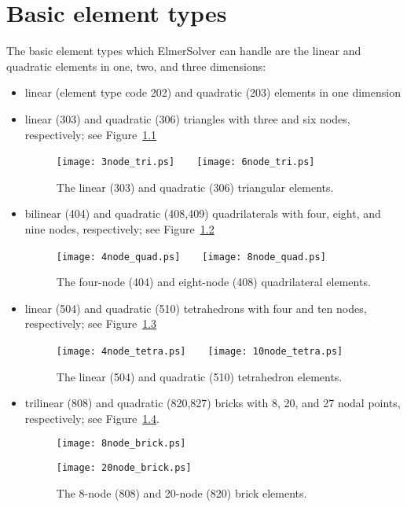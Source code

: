 
\chapter{Basic element types}%
\label{elements}

The basic element types which ElmerSolver can handle are
the linear and quadratic elements in one, two, and three dimensions:
\begin{itemize}
\item linear (element type code 202) and quadratic (203) elements in one dimension
\item linear (303) and quadratic (306) triangles with three and six nodes, respectively; 
see Figure~\ref{triangles}
\begin{figure}[h]
\centerline{ \texttt{[image: 3node\_tri.ps]}\ \ \ \ \texttt{[image: 6node\_tri.ps]} }
\caption{The linear (303) and quadratic (306) triangular elements.}
\label{triangles}
\end{figure}
\item bilinear (404) and quadratic (408,409) quadrilaterals with four, eight, and nine nodes, respectively;  
see Figure~\ref{quads}
\begin{figure}[h]
\centerline{ \texttt{[image: 4node\_quad.ps]}\ \ \ \ \texttt{[image: 8node\_quad.ps]} }
\caption{The four-node (404) and  eight-node (408) quadrilateral elements.}
\label{quads}
\end{figure}
\item linear (504) and quadratic (510) tetrahedrons with four and ten nodes, respectively; 
see Figure~\ref{tetras}
\begin{figure}[h]
\centerline{ \texttt{[image: 4node\_tetra.ps]}\ \ \ \ \texttt{[image: 10node\_tetra.ps]} }
\caption{The linear (504) and quadratic (510) tetrahedron elements.}
\label{tetras}
\end{figure}
\item  trilinear (808) and
quadratic (820,827) bricks  with 8, 20, and 27 nodal points, respectively; see Figure~\ref{hexas}.
\begin{figure}[h]
\centerline{ \texttt{[image: 8node\_brick.ps]}}
\centerline{ \texttt{[image: 20node\_brick.ps]}}
 \caption{The 8-node (808) and 20-node (820) brick elements.}
\label{hexas}
\end{figure}
\end{itemize}


